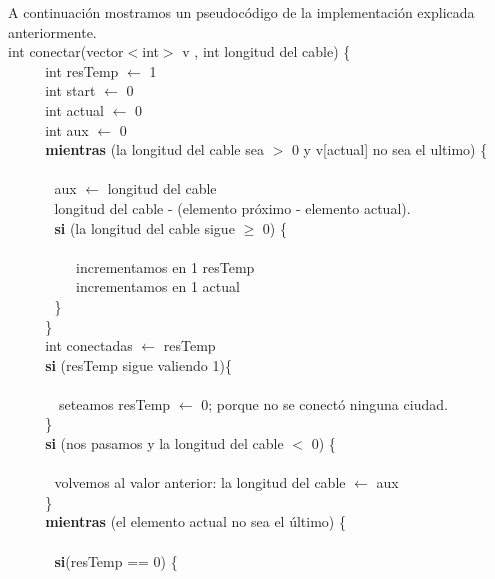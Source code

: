 A continuación mostramos un pseudocódigo de la implementación explicada anteriormente. \\

int conectar(vector$<$int$>$ v , int longitud del cable) \{ \\
$~~~~~~~~~~~~$int resTemp $\leftarrow$ 1 \\
$~~~~~~~~~~~~$int start $\leftarrow$ 0 \\
$~~~~~~~~~~~~$int actual $\leftarrow$ 0 \\
$~~~~~~~~~~~~$int aux $\leftarrow$ 0 \\
$~~~~~~~~~~~~$\textbf{mientras} (la longitud del cable sea $>$ 0 y v[actual] no sea el ultimo) \{ \\  \\
$~~~~~~~~~~~~~~~$aux  $\leftarrow$ longitud del cable \\
$~~~~~~~~~~~~~~~$longitud del cable - (elemento próximo - elemento actual).\\
$~~~~~~~~~~~~~~~$\textbf{si} (la longitud del cable sigue $\geq$ 0) \{ \\ \\
$~~~~~~~~~~~~~~~~~~~~~~$incrementamos en 1 resTemp\\
$~~~~~~~~~~~~~~~~~~~~~~$incrementamos en 1 actual\\
$~~~~~~~~~~~~~~~$\} \\ 
$~~~~~~~~~~~~$\} \\ 
$~~~~~~~~~~~~$int conectadas $\leftarrow$ resTemp \\
$~~~~~~~~~~~~$\textbf{si} (resTemp sigue valiendo 1)\{ \\ \\
$~~~~~~~~~~~~~~~$ seteamos resTemp $\leftarrow$ 0; porque no se conectó ninguna ciudad. \\
$~~~~~~~~~~~~$\} \\ 
$~~~~~~~~~~~~$\textbf{si} (nos pasamos y la longitud del cable $<$ 0) \{ \\   \\
$~~~~~~~~~~~~~~~$volvemos al valor anterior: la longitud del cable $\leftarrow$ aux\\
$~~~~~~~~~~~~$\} \\ 
$~~~~~~~~~~~~$\textbf{mientras} (el elemento actual no sea el último) \{  \\  \\
$~~~~~~~~~~~~~~~$\textbf{si}(resTemp == 0) \{ \\  \\
